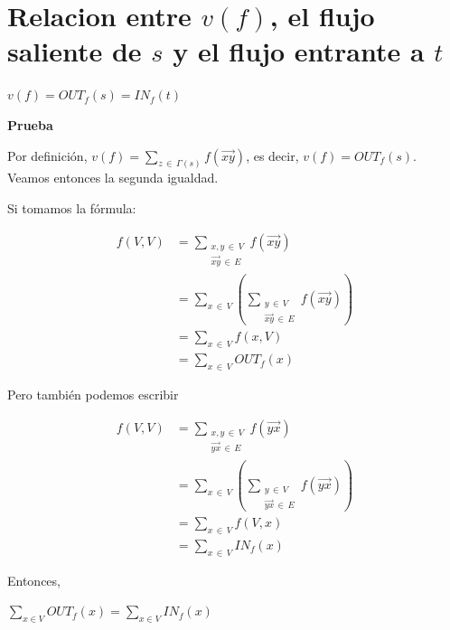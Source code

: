 \documentclass[10pt,a4paper]{article}
\begin{document}
\section*{Relacion entre $v(f)$, el flujo saliente de $s$ y el flujo entrante a $t$}

\begin{center}
$v(f) = OUT_f(s) = IN_f(t)$
\end{center}

\textbf{Prueba}

Por definición, $v(f) = \sum\limits_{z\,\in\,\Gamma(s)}f(\overrightarrow{xy})$, es decir, $v(f) = OUT_f(s)$. Veamos entonces la segunda igualdad.

Si tomamos la fórmula:

\begin{center}
\begin{align*} f(V, V) &= \sum\limits_{\substack{x, y\, \in\, V\\\overrightarrow{xy}\, \in \,E}} f(\overrightarrow{xy})\\ &= \sum\limits_{x\, \in\, V} \left(\sum\limits_{\substack{ y\, \in\, V\\\overrightarrow{xy}\, \in \,E}} f(\overrightarrow{xy})\right)\\ &= \sum\limits_{x\, \in\, V} f(x, V) \\ &= \sum\limits_{x\, \in\, V}OUT_f(x) \end{align*}
\end{center}

Pero también podemos escribir

\begin{center}
\begin{align*} f(V, V) &= \sum\limits_{\substack{x, y\, \in\, V\\\overrightarrow{yx}\, \in \,E}} f(\overrightarrow{yx})\\ &= \sum\limits_{x\, \in\, V} \left(\sum\limits_{\substack{ y\, \in\, V\\\overrightarrow{yx}\, \in \,E}} f(\overrightarrow{yx})\right)\\ &= \sum\limits_{x\, \in\, V} f(V, x) \\ &= \sum\limits_{x\, \in\, V}IN_f(x) \end{align*}
\end{center}

Entonces,

\begin{center}
$\sum\limits_{x \in V} OUT_f(x) = \sum\limits_{x \in V}IN_f(x)$
\end{center}
\end{document}
